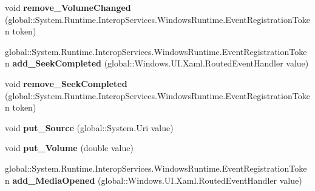 \begin{DoxyCompactItemize}
\item 
\mbox{\label{interface_windows_1_1_u_i_1_1_xaml_1_1_controls_1_1_i_media_element_a60f936214a2f097646cfe13f567cf130}} 
void {\bfseries remove\+\_\+\+Volume\+Changed} (global\+::\+System.\+Runtime.\+Interop\+Services.\+Windows\+Runtime.\+Event\+Registration\+Token token)
\item 
\mbox{\label{interface_windows_1_1_u_i_1_1_xaml_1_1_controls_1_1_i_media_element_a64d29cca7343776b34eef183fe2f0a47}} 
global\+::\+System.\+Runtime.\+Interop\+Services.\+Windows\+Runtime.\+Event\+Registration\+Token {\bfseries add\+\_\+\+Seek\+Completed} (global\+::\+Windows.\+U\+I.\+Xaml.\+Routed\+Event\+Handler value)
\item 
\mbox{\label{interface_windows_1_1_u_i_1_1_xaml_1_1_controls_1_1_i_media_element_adb3cb1c1f4bff532d4654363a56adcf1}} 
void {\bfseries remove\+\_\+\+Seek\+Completed} (global\+::\+System.\+Runtime.\+Interop\+Services.\+Windows\+Runtime.\+Event\+Registration\+Token token)
\item 
\mbox{\label{interface_windows_1_1_u_i_1_1_xaml_1_1_controls_1_1_i_media_element_a9ccfe5f23b86ca54424f89ee8816be21}} 
void {\bfseries put\+\_\+\+Source} (global\+::\+System.\+Uri value)
\item 
\mbox{\label{interface_windows_1_1_u_i_1_1_xaml_1_1_controls_1_1_i_media_element_a499a56726198bd3a2e13da7fdaea8eb4}} 
void {\bfseries put\+\_\+\+Volume} (double value)
\item 
\mbox{\label{interface_windows_1_1_u_i_1_1_xaml_1_1_controls_1_1_i_media_element_af710ba32e5c086d5646e1a61e3a2bbaf}} 
global\+::\+System.\+Runtime.\+Interop\+Services.\+Windows\+Runtime.\+Event\+Registration\+Token {\bfseries add\+\_\+\+Media\+Opened} (global\+::\+Windows.\+U\+I.\+Xaml.\+Routed\+Event\+Handler value)
\item 
\mbox{\label{interface_windows_1_1_u_i_1_1_xaml_1_1_controls_1_1_i_media_element_ab974c092f3afe5c2c6eb21871e35d724}} 

\end{DoxyCompactItemize}
